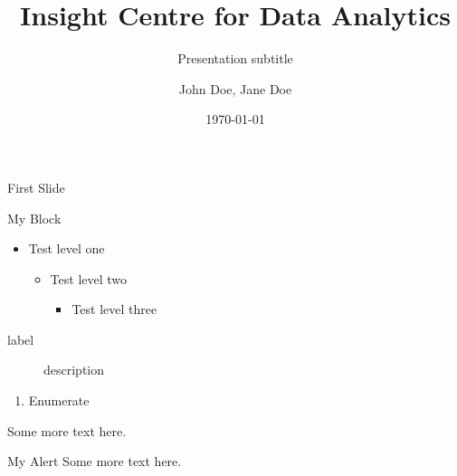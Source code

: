 \documentclass{beamer}
\title{Insight Centre for Data Analytics}
\subtitle{Presentation subtitle}
\author{John Doe, Jane Doe}
\date[\today]{\today}  %
\begin{document}
\frame{\titlepage}


\begin{frame}{First Slide}
\begin{block}{My Block}
\begin{itemize}
\item Test level one
    \begin{itemize}
    \item Test level two
        \begin{itemize}
        \item Test level three
        \end{itemize}
    \end{itemize}
\end{itemize}
\end{block}

\begin{description}
\item[label] description
\end{description}

\begin{enumerate}
\item Enumerate
\end{enumerate}

\begin{example}
Some more text here.
\end{example}

\begin{alert}{My Alert}
Some more text here.
\end{alert}
\end{frame}
\end{document}
